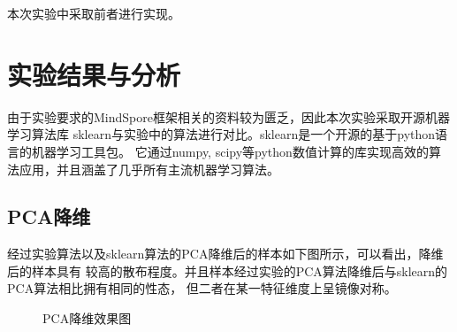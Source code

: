 \documentclass[notitlepage]{article}
\begin{document}
本次实验中采取前者进行实现。

\section{实验结果与分析}

由于实验要求的MindSpore框架相关的资料较为匮乏，因此本次实验采取开源机器学习算法库
sklearn与实验中的算法进行对比。sklearn是一个开源的基于python语言的机器学习工具包。
它通过numpy, scipy等python数值计算的库实现高效的算法应用，并且涵盖了几乎所有主流机器学习算法。

\subsection*{PCA降维}

经过实验算法以及sklearn算法的PCA降维后的样本如下图所示，可以看出，降维后的样本具有
较高的散布程度。并且样本经过实验的PCA算法降维后与sklearn的PCA算法相比拥有相同的性态，
但二者在某一特征维度上呈镜像对称。

\begin{figure}[htbp]
	\centering
	\hspace{3pt}
	\caption{PCA降维效果图}
\end{figure}
\end{document}
